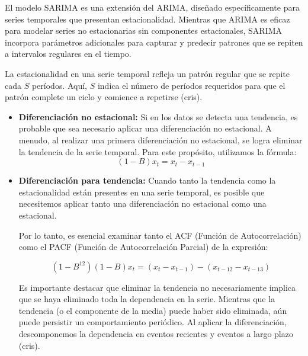 El modelo SARIMA es una extensión del ARIMA, diseñado específicamente para series temporales que presentan estacionalidad. Mientras que ARIMA es eficaz para modelar series no estacionarias sin componentes estacionales, SARIMA incorpora parámetros adicionales para capturar y predecir patrones que se repiten a intervalos regulares en el tiempo.

La estacionalidad en una serie temporal refleja un patrón regular que se repite cada 
\( S \) períodos. Aquí, \( S \) indica el número de períodos requeridos para que el patrón complete un ciclo y comience a repetirse (cris).

\begin{itemize}
\item \textbf{Diferenciación no estacional:} Si en los datos se detecta una tendencia, es probable que sea necesario aplicar una diferenciación no estacional. A menudo, al realizar una primera diferenciación no estacional, se logra eliminar la tendencia de la serie temporal. Para este propósito, utilizamos la fórmula:
    \begin{equation*}
        (1 - B) x_t = x_t - x_{t-1}
    \end{equation*}
\end{itemize}

\begin{itemize}
    \item \textbf{Diferenciación para tendencia:} Cuando tanto la tendencia como la estacionalidad están presentes en una serie temporal, es posible que necesitemos aplicar tanto una diferenciación no estacional como una estacional.

    Por lo tanto, es esencial examinar tanto el ACF (Función de Autocorrelación) como el PACF (Función de Autocorrelación Parcial) de la expresión:
    
        \begin{equation*}
            (1 - B^{12})(1 - B) x_t = (x_t - x_{t-1}) - (x_{t-12} - x_{t-13})
        \end{equation*}
    
        Es importante destacar que eliminar la tendencia no necesariamente implica que se haya eliminado toda la dependencia en la serie. Mientras que la tendencia (o el componente de la media) puede haber sido eliminada, aún puede persistir un comportamiento periódico. Al aplicar la diferenciación, descomponemos la dependencia en eventos recientes y eventos a largo plazo (cris).    
\end{itemize}


